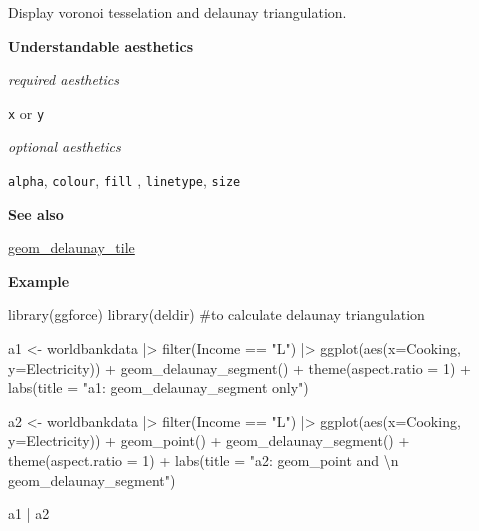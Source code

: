 \documentclass[
  letterpaper,
  DIV=11,
  numbers=noendperiod]{scrreprt}
\newenvironment{Shaded}{\begin{snugshade}}{\end{snugshade}}
\newcommand{\AttributeTok}[1]{\textcolor[rgb]{0.40,0.45,0.13}{#1}}
\newcommand{\CommentTok}[1]{\textcolor[rgb]{0.37,0.37,0.37}{#1}}
\newcommand{\DecValTok}[1]{\textcolor[rgb]{0.68,0.00,0.00}{#1}}
\newcommand{\FunctionTok}[1]{\textcolor[rgb]{0.28,0.35,0.67}{#1}}
\newcommand{\NormalTok}[1]{\textcolor[rgb]{0.00,0.23,0.31}{#1}}
\newcommand{\OtherTok}[1]{\textcolor[rgb]{0.00,0.23,0.31}{#1}}
\newcommand{\SpecialCharTok}[1]{\textcolor[rgb]{0.37,0.37,0.37}{#1}}
\newcommand{\StringTok}[1]{\textcolor[rgb]{0.13,0.47,0.30}{#1}}
\begin{document}
Display voronoi tesselation and delaunay triangulation.

\textbf{Understandable aesthetics}

\emph{required aesthetics}

\texttt{x} or \texttt{y}

\emph{optional aesthetics}

\texttt{alpha}, \texttt{colour}, \texttt{fill} , \texttt{linetype},
\texttt{size}

\textbf{See also}

\hyperref[delaunay_tile]{geom\_delaunay\_tile}

\textbf{Example}

\begin{Shaded}
\begin{Highlighting}[]
\FunctionTok{library}\NormalTok{(ggforce)}
\FunctionTok{library}\NormalTok{(deldir) }\CommentTok{\#to calculate delaunay triangulation}

\NormalTok{a1 }\OtherTok{\textless{}{-}}\NormalTok{ worldbankdata }\SpecialCharTok{|\textgreater{}}
  \FunctionTok{filter}\NormalTok{(Income }\SpecialCharTok{==} \StringTok{"L"}\NormalTok{) }\SpecialCharTok{|\textgreater{}}
  \FunctionTok{ggplot}\NormalTok{(}\FunctionTok{aes}\NormalTok{(}\AttributeTok{x=}\NormalTok{Cooking, }\AttributeTok{y=}\NormalTok{Electricity)) }\SpecialCharTok{+}   
  \FunctionTok{geom\_delaunay\_segment}\NormalTok{() }\SpecialCharTok{+} 
  \FunctionTok{theme}\NormalTok{(}\AttributeTok{aspect.ratio =} \DecValTok{1}\NormalTok{) }\SpecialCharTok{+}
  \FunctionTok{labs}\NormalTok{(}\AttributeTok{title =} \StringTok{"a1: geom\_delaunay\_segment only"}\NormalTok{) }

\NormalTok{a2 }\OtherTok{\textless{}{-}}\NormalTok{ worldbankdata }\SpecialCharTok{|\textgreater{}}
  \FunctionTok{filter}\NormalTok{(Income }\SpecialCharTok{==} \StringTok{"L"}\NormalTok{) }\SpecialCharTok{|\textgreater{}}
  \FunctionTok{ggplot}\NormalTok{(}\FunctionTok{aes}\NormalTok{(}\AttributeTok{x=}\NormalTok{Cooking, }\AttributeTok{y=}\NormalTok{Electricity)) }\SpecialCharTok{+}   
  \FunctionTok{geom\_point}\NormalTok{() }\SpecialCharTok{+}
  \FunctionTok{geom\_delaunay\_segment}\NormalTok{() }\SpecialCharTok{+} 
  \FunctionTok{theme}\NormalTok{(}\AttributeTok{aspect.ratio =} \DecValTok{1}\NormalTok{) }\SpecialCharTok{+}
  \FunctionTok{labs}\NormalTok{(}\AttributeTok{title =} \StringTok{"a2: geom\_point and }\SpecialCharTok{\textbackslash{}n}\StringTok{ geom\_delaunay\_segment"}\NormalTok{) }

\NormalTok{a1 }\SpecialCharTok{|}\NormalTok{ a2}
\end{Highlighting}
\end{Shaded}
\end{document}
